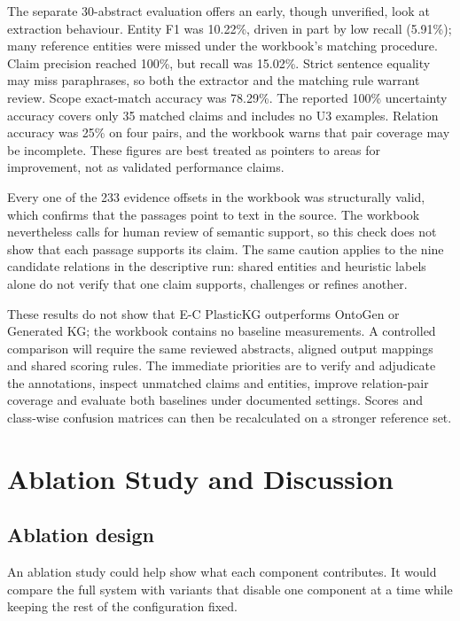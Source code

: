 \documentclass[11pt,a4paper]{article}
\begin{document}
The separate 30-abstract evaluation offers an early, though unverified, look at extraction behaviour. Entity F1 was 10.22\%, driven in part by low recall (5.91\%); many reference entities were missed under the workbook's matching procedure. Claim precision reached 100\%, but recall was 15.02\%. Strict sentence equality may miss paraphrases, so both the extractor and the matching rule warrant review. Scope exact-match accuracy was 78.29\%. The reported 100\% uncertainty accuracy covers only 35 matched claims and includes no U3 examples. Relation accuracy was 25\% on four pairs, and the workbook warns that pair coverage may be incomplete. These figures are best treated as pointers to areas for improvement, not as validated performance claims.

Every one of the 233 evidence offsets in the workbook was structurally valid, which confirms that the passages point to text in the source. The workbook nevertheless calls for human review of semantic support, so this check does not show that each passage supports its claim. The same caution applies to the nine candidate relations in the descriptive run: shared entities and heuristic labels alone do not verify that one claim supports, challenges or refines another.

These results do not show that E-C PlasticKG outperforms OntoGen or Generated KG; the workbook contains no baseline measurements. A controlled comparison will require the same reviewed abstracts, aligned output mappings and shared scoring rules. The immediate priorities are to verify and adjudicate the annotations, inspect unmatched claims and entities, improve relation-pair coverage and evaluate both baselines under documented settings. Scores and class-wise confusion matrices can then be recalculated on a stronger reference set.

\section{Ablation Study and Discussion}

\subsection{Ablation design}

An ablation study could help show what each component contributes. It would compare the full system with variants that disable one component at a time while keeping the rest of the configuration fixed.
\end{document}
